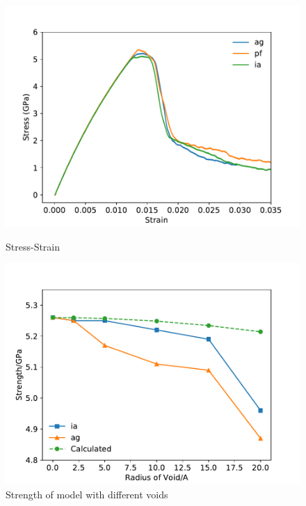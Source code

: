 \documentclass[times,12pt]{elsarticle}
\begin{document}
\begin{figure}[h]
	\centering
	\begin{minipage}{0.495\textwidth}
		\includegraphics[width=1\linewidth]{img/allline}
		\centering
		\caption{Stress-Strain}
		\label{fig:stress&strain}
	\end{minipage}	
	\hfill
	\begin{minipage}{0.495\textwidth}		
		\includegraphics[width=1\linewidth]{img/effect_of_vol}
		\centering
		\caption{Strength of model with different voids}
		\label{fig:strength}
	\end{minipage}
\end{figure}
\end{document}
